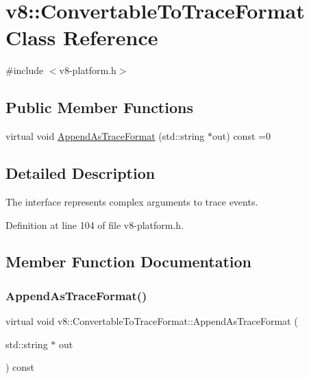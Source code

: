 \hypertarget{classv8_1_1ConvertableToTraceFormat}{}\section{v8\+:\+:Convertable\+To\+Trace\+Format Class Reference}
\label{classv8_1_1ConvertableToTraceFormat}


{\ttfamily \#include $<$v8-\/platform.\+h$>$}

\subsection*{Public Member Functions}
\begin{DoxyCompactItemize}
\item 
virtual void \mbox{\hyperlink{classv8_1_1ConvertableToTraceFormat_a11f3295df2906e09c1f266049d130013}{Append\+As\+Trace\+Format}} (std\+::string $\ast$out) const =0
\end{DoxyCompactItemize}


\subsection{Detailed Description}
The interface represents complex arguments to trace events. 

Definition at line 104 of file v8-\/platform.\+h.



\subsection{Member Function Documentation}
\mbox{\label{classv8_1_1ConvertableToTraceFormat_a11f3295df2906e09c1f266049d130013}} 
\subsubsection{\texorpdfstring{Append\+As\+Trace\+Format()}{AppendAsTraceFormat()}}
{\footnotesize\ttfamily virtual void v8\+::\+Convertable\+To\+Trace\+Format\+::\+Append\+As\+Trace\+Format (\begin{DoxyParamCaption}\item[{std\+::string $\ast$}]{out }\end{DoxyParamCaption}) const\hspace{0.3cm}{\ttfamily [pure virtual]}}

